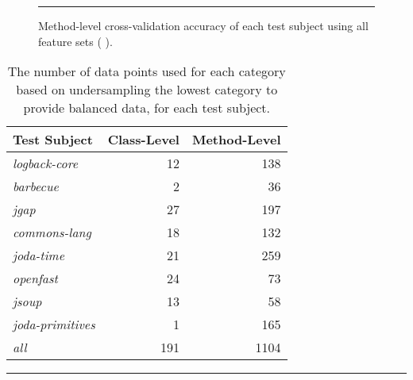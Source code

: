 \begin{figure}[!tb]
  \centering
  \begin{adjustbox}{max size={.95\textwidth}{.95\textheight}}
    
  \end{adjustbox}
  \caption{Method-level cross-validation accuracy of each test subject using all feature sets (   ).}
  \vspace{2mm}
  \hrule
  \label{fig:individual_cross_validation_method_1_2_3_4_graph}
\end{figure}

\begin{table}[!tb]
  \centering
  \begin{threeparttable}
    \begin{tabular}{|l|r|r|}
      \rowcolor[RGB]{169,196,223}
      \hline \textbf{Test Subject} & \textbf{Class-Level} & \textbf{Method-Level} \\
      \hline \emph{logback-core} & 12 & 138 \\
      \hline \emph{barbecue} & 2 & 36 \\
      \hline \emph{jgap} & 27 & 197 \\
      \hline \emph{commons-lang} & 18 & 132 \\
      \hline \emph{joda-time} & 21 & 259 \\
      \hline \emph{openfast} & 24 & 73 \\
      \hline \emph{jsoup} & 13 & 58 \\
      \hline \emph{joda-primitives} & 1 & 165 \\
      \hline \emph{all} & 191 & 1104 \\
      \hline
    \end{tabular}
  \end{threeparttable}
  \caption{The number of data points used for each category based on undersampling the lowest category to provide balanced data, for each test subject.}
  \vspace{2mm}
  \hrule
  \label{tab:experiments_undersampled_data}
\end{table}

